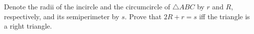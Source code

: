 Denote the radii of the incircle and the circumcircle of $\triangle ABC$ by $r$ and $R$, respectively, and its semiperimeter by $s$. Prove that $2R + r = s$ iff the triangle is a right triangle.
